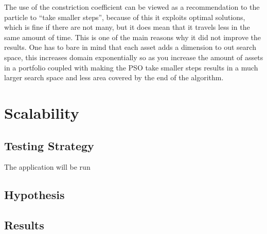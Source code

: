 \documentclass{pdfmx4020}
\begin{document}
      The use of the constriction coefficient can be viewed as a recommendation to the particle to ``take smaller steps''\cite{constriction_factor_4}, because of this it exploits optimal solutions, which is fine if there are not many, but it does mean that it travels less in the same amount of time. This is one of the main reasons why it did not improve the results. One has to bare in mind that each asset adds a dimension to out search space, this increases domain exponentially so as you increase the amount of assets in a portfolio coupled with making the PSO take smaller steps results in a much larger search space and less area covered by the end of the algorithm. 
       



  \section{Scalability} %
  \label{sec:scalability}

    \subsection{Testing Strategy} %
    \label{sub:testing_strategy}
      The application will be run


    \subsection{Hypothesis} %
    \label{sub:hypothesis}
      

    \subsection{Results} %
    \label{sub:results}
      
\end{document}
